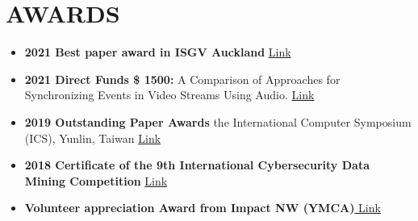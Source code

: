 \documentclass[letterpaper,11pt]{article}
\newcommand{\resumeSubHeadingListStart}{\begin{itemize}[leftmargin=*]}
\newcommand{\resumeSubHeadingListEnd}{\end{itemize}}
\begin{document}
\section{\textbf{ AWARDS}}

\resumeSubHeadingListStart



 \item {\textbf{ 2021 Best paper award in ISGV Auckland}}
  \hspace*{0pt}\hfill {\href{https://doi.org/10.1007/978-981-13-9190-3_69}{ \color{blue} Link}}
  
  \item {\textbf{ 2021 Direct Funds \$ 1500:}{ A Comparison of Approaches for Synchronizing Events in Video Streams Using Audio.}}\hspace*{0pt}\hfill
    {\color{blue}\href{https://link.springer.com/chapter/10.1007\%2F978-3-030-72073-5_20}{\color{blue} Link}}
  \item{\textbf{ 2019 Outstanding Paper Awards}{ the International Computer Symposium (ICS), Yunlin, Taiwan}} 
    \hspace*{0pt}\hfill {\color{blue}\href{https://static.wixstatic.com/media/db40d1_26c0561b41b34f4db3d36c0a54c91172~mv2_d_3264_2448_s_4_2.jpg}{ \color{blue}Link}}
    \item{\textbf{ 2018 Certificate of the 9th International Cybersecurity Data Mining Competition}}\hspace*{0pt}\hfill
    {\color{red}\href{https://static.wixstatic.com/media/db40d1_0071a864632b46a291aa9e570168510d~mv2.jpg}{ \color{blue}Link}}
      
      
      
      \item{\textbf{Volunteer appreciation Award from Impact NW (YMCA)}}\hspace*{0pt}\hfill{\color{blue}\href{https://static.wixstatic.com/media/db40d1_7962f9efd2fc46dc8061aff2dc661a02~mv2.jpeg}{ Link}}

  \resumeSubHeadingListEnd

 



\end{document}
